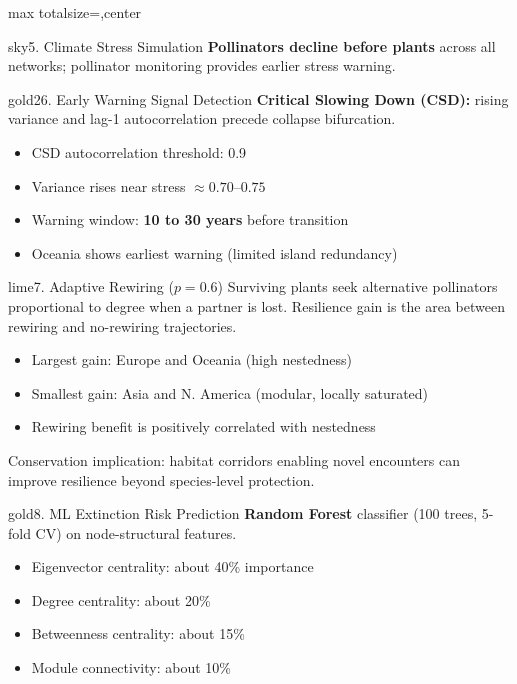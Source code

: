 \documentclass[10pt]{article}
\begin{document}
\begin{adjustbox}{max totalsize={\textwidth}{\textheight},center}
\begin{minipage}{\textwidth}
\begin{minipage}[t]{0.327\textwidth}
\begin{card}{sky}{5. Climate Stress Simulation}
\textbf{Pollinators decline before plants} across all networks; pollinator monitoring provides earlier stress warning.
\end{card}

\vspace{1.0mm}
\begin{card}{gold2}{6. Early Warning Signal Detection}
\textbf{Critical Slowing Down (CSD):} rising variance and lag-1 autocorrelation precede collapse bifurcation.

\begin{itemize}[leftmargin=*,nosep]
  \item CSD autocorrelation threshold: 0.9
  \item Variance rises near stress $\approx 0.70$--$0.75$
  \item Warning window: \textbf{10 to 30 years} before transition
  \item Oceania shows earliest warning (limited island redundancy)
\end{itemize}
\end{card}

\end{minipage}\hfill
\begin{minipage}[t]{0.327\textwidth}

\begin{card}{lime}{7. Adaptive Rewiring ($p=0.6$)}
Surviving plants seek alternative pollinators proportional to degree when a partner is lost. Resilience gain is the area between rewiring and no-rewiring trajectories.

\begin{itemize}[leftmargin=*,nosep]
  \item Largest gain: Europe and Oceania (high nestedness)
  \item Smallest gain: Asia and N. America (modular, locally saturated)
  \item Rewiring benefit is positively correlated with nestedness
\end{itemize}

Conservation implication: habitat corridors enabling novel encounters can improve resilience beyond species-level protection.
\end{card}

\vspace{1.0mm}
\begin{card}{gold}{8. ML Extinction Risk Prediction}
\textbf{Random Forest} classifier (100 trees, 5-fold CV) on node-structural features.

\begin{itemize}[leftmargin=*,nosep]
  \item Eigenvector centrality: about 40\% importance
  \item Degree centrality: about 20\%
  \item Betweenness centrality: about 15\%
  \item Module connectivity: about 10\%
\end{itemize}


\end{card}
\end{minipage}
\end{minipage}
\end{adjustbox}
\end{document}
